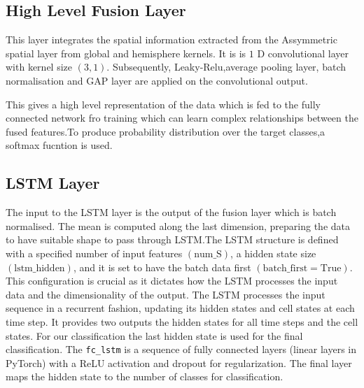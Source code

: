 \subsection*{High Level Fusion Layer}
This layer integrates the spatial information extracted from the Assymmetric spatial layer from global and hemisphere kernels. It is is $1$ D convolutional layer with kernel size $(3, 1)$. Subsequently, Leaky-Relu,average pooling layer, batch normalisation and GAP layer are applied on the convolutional output.

This gives a high level representation of the data which is fed to the fully connected network fro training which can learn complex relationships between the fused features.To produce probability distribution over the target classes,a softmax fucntion is used.

\subsection*{LSTM Layer}
The input to the LSTM layer is the output of the fusion layer which is batch normalised. The mean is computed along the last dimension, preparing the data to have suitable shape to pass through LSTM.The LSTM structure is defined with a specified number of input features \((\text{num\_S})\), a hidden state size \((\text{lstm\_hidden})\), and it is set to have the batch data first \((\text{batch\_first} = \text{True})\). This configuration is crucial as it dictates how the LSTM processes the input data and the dimensionality of the output.
The LSTM processes the input sequence in a recurrent fashion, updating its hidden states and cell states at each time step.
It provides two outputs the hidden states for all time steps and the cell states. For our classification the last hidden state is used for the final classification.
The \texttt{fc\_lstm} is a sequence of fully connected layers (linear layers in PyTorch) with a ReLU activation and dropout for regularization. The final layer maps the hidden state to the number of classes for classification.


  
